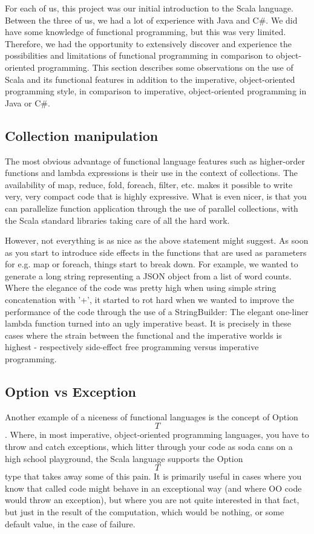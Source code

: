 
For each of us, this project was our initial introduction to the Scala
language. Between the three of us, we had a lot of experience with Java and C\#.
We did have some knowledge of functional programming, but this was very limited.
Therefore, we had the opportunity to extensively discover and experience the
possibilities and limitations of functional programming in comparison to
object-oriented programming. This section describes some observations on the use
of Scala and its functional features in addition to the imperative,
object-oriented programming style, in comparison to imperative, object-oriented
programming in Java or C\#.

\subsection{Collection manipulation}
The most obvious advantage of functional language features such as higher-order
functions and lambda expressions is their use in the context of collections. The
availability of map, reduce, fold, foreach, filter, etc. makes it possible to
write very, very compact code that is highly expressive. What is even nicer, is that
you can parallelize function application through the use of parallel collections,
with the Scala standard libraries taking care of all the hard work.

However, not everything is as nice as the above statement might suggest. As soon
as you start to introduce side effects in the functions that are used as parameters
for e.g. map or foreach, things start to break down. For example, we wanted to
generate a long string representing a JSON object from a list of word counts. Where
the elegance of the code was pretty high when using simple string concatenation with '+',
it started to rot hard when we wanted to improve the performance of the code through
the use of a StringBuilder: The elegant one-liner lambda function turned into an ugly
imperative beast. It is precisely in these cases where the strain between the functional and
the imperative worlds is highest - respectively side-effect free programming versus
imperative programming.

\subsection{Option vs Exception}
Another example of a niceness of functional languages is the concept of Option\[T\].
Where, in most imperative, object-oriented programming languages, you have to throw
and catch exceptions, which litter through your code as soda cans on a high school playground,
the Scala language supports the Option\[T\] type that takes away some of this pain.
It is primarily useful in cases where you know that called code might behave in an
exceptional way (and where OO code would throw an exception), but where you are not
quite interested in that fact, but just in the result of the computation, which would
be nothing, or some default value, in the case of failure.

